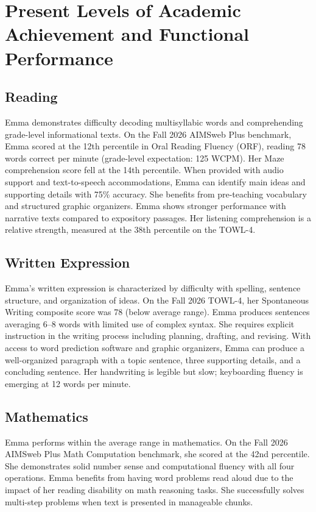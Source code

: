 \section{Present Levels of Academic Achievement and Functional Performance}

\subsection{Reading}

Emma demonstrates difficulty decoding multisyllabic words and comprehending grade-level informational texts. On the Fall 2026 AIMSweb Plus benchmark, Emma scored at the 12th percentile in Oral Reading Fluency (ORF), reading 78 words correct per minute (grade-level expectation: 125 WCPM). Her Maze comprehension score fell at the 14th percentile. When provided with audio support and text-to-speech accommodations, Emma can identify main ideas and supporting details with 75\% accuracy. She benefits from pre-teaching vocabulary and structured graphic organizers. Emma shows stronger performance with narrative texts compared to expository passages. Her listening comprehension is a relative strength, measured at the 38th percentile on the TOWL-4.

\subsection{Written Expression}

Emma's written expression is characterized by difficulty with spelling, sentence structure, and organization of ideas. On the Fall 2026 TOWL-4, her Spontaneous Writing composite score was 78 (below average range). Emma produces sentences averaging 6--8 words with limited use of complex syntax. She requires explicit instruction in the writing process including planning, drafting, and revising. With access to word prediction software and graphic organizers, Emma can produce a well-organized paragraph with a topic sentence, three supporting details, and a concluding sentence. Her handwriting is legible but slow; keyboarding fluency is emerging at 12 words per minute.

\subsection{Mathematics}

Emma performs within the average range in mathematics. On the Fall 2026 AIMSweb Plus Math Computation benchmark, she scored at the 42nd percentile. She demonstrates solid number sense and computational fluency with all four operations. Emma benefits from having word problems read aloud due to the impact of her reading disability on math reasoning tasks. She successfully solves multi-step problems when text is presented in manageable chunks.

